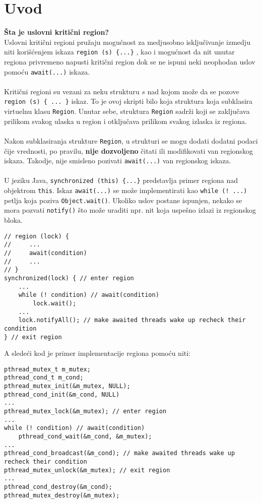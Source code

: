 \section{Uvod}
\textbf{\v{S}ta je uslovni kriti\v{c}ni region?}\\
Uslovni kriti\v{c}ni regioni pru\v{z}aju mogu\'{c}nost za medjusobno isklju\v{c}ivanje izmedju niti kori\v{s}\'{c}enjem iskaza \texttt{region (s) \{...\}} , kao i mogu\'{c}nost da nit unutar regiona privremeno napusti kriti\v{c}ni region dok se ne ispuni neki neophodan uslov pomo\'{c}u \texttt{await(...)} iskaza.
\\\\
Kriti\v{c}ni regioni su vezani za neku strukturu $s$  nad kojom mo\v{z}e da se pozove \texttt{region (s) \{ ... \}} iskaz. To je ovoj skripti bilo koja struktura koja subklasira virtuelnu klasu \texttt{Region}. Unutar sebe, struktura \texttt{Region} sadr\v{z}i  koji se zaklju\v{c}ava prilikom svakog ulaska u region i otklju\v{c}ava prilikom svakog izlaska iz regiona.
\\\\
Nakon subklasiranja strukture \texttt{Region}, u strukturi se mogu dodati dodatni podaci \v{c}ije vrednosti, po pravilu, \textbf{nije dozvoljeno} \v{c}itati ili modifikovati van regionskog iskaza. Takodje, nije smisleno pozivati \texttt{await(...)} van regionskog iskaza.
\\\\
U jeziku Java, \texttt{synchronized (this) \{...\}}  predstavlja primer regiona nad objektrom \texttt{this}. Iskaz \texttt{await(...)} se mo\v{z}e implementirati kao \texttt{while (! ...)} petlja koja poziva \texttt{Object.wait()}. Ukoliko uslov postane ispunjen, nekako se mora pozvati \texttt{notify()} \v{s}to mo\v{z}e uraditi npr. nit koja uspe\v{s}no izlazi iz regionskog bloka.
\begin{lstlisting}
// region (lock) {
//     ...
//     await(condition)
//     ...
// }
synchronized(lock) { // enter region
    ...
    while (! condition) // await(condition)
        lock.wait();
    ...
    lock.notifyAll(); // make awaited threads wake up recheck their condition
} // exit region
\end{lstlisting}
A slede\'{c}i kod je primer implementacije regiona pomo\'{c}u  niti:
\begin{lstlisting}
pthread_mutex_t m_mutex;
pthread_cond_t m_cond;
pthread_mutex_init(&m_mutex, NULL);
pthread_cond_init(&m_cond, NULL)
...
pthread_mutex_lock(&m_mutex); // enter region
...
while (! condition) // await(condition)
    pthread_cond_wait(&m_cond, &m_mutex); 
...
pthread_cond_broadcast(&m_cond); // make awaited threads wake up recheck their condition
pthread_mutex_unlock(&m_mutex); // exit region
...
pthread_cond_destroy(&m_cond);
pthread_mutex_destroy(&m_mutex);
\end{lstlisting}